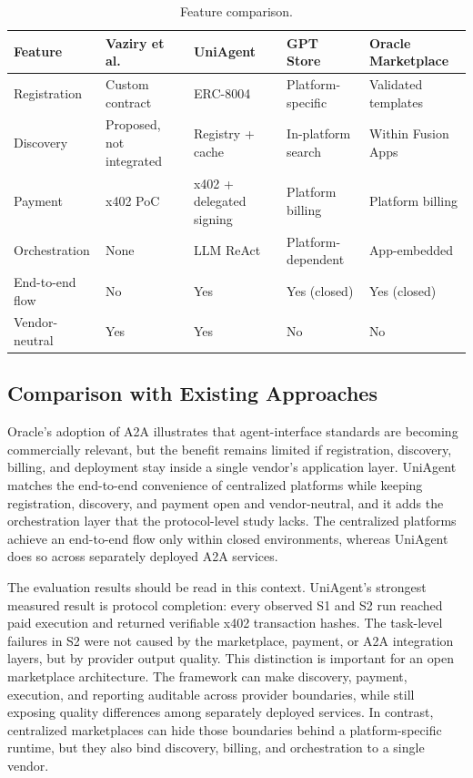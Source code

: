 \documentclass[sigconf]{acmart}
\begin{document}
\begin{table}[t]
  \centering
  \caption{Feature comparison.}
  \label{tab:comparison}
  \small
  \begin{tabular}{@{}p{}p{}p{}p{}p{}@{}}
    \toprule
    Feature & Vaziry et al. & UniAgent & GPT Store & Oracle Marketplace \\
    \midrule
    Registration & Custom contract & ERC-8004 & Platform-specific & Validated templates \\
    Discovery & Proposed, not integrated & Registry + cache & In-platform search & Within Fusion Apps \\
    Payment & x402 PoC & x402 + delegated signing & Platform billing & Platform billing \\
    Orchestration & None & LLM ReAct & Platform-dependent & App-embedded \\
    End-to-end flow & No & Yes & Yes (closed) & Yes (closed) \\
    Vendor-neutral & Yes & Yes & No & No \\
    \bottomrule
  \end{tabular}
\end{table}

\subsection{Comparison with Existing Approaches}
Oracle's adoption of A2A illustrates that agent-interface standards are becoming
commercially relevant, but the benefit remains limited if registration,
discovery, billing, and deployment stay inside a single vendor's
application layer. UniAgent matches the end-to-end
convenience of centralized platforms while keeping registration,
discovery, and payment open and vendor-neutral, and it adds the
orchestration layer that the protocol-level study lacks. The centralized
platforms achieve an end-to-end flow only within closed environments,
whereas UniAgent does so across separately deployed A2A services.

The evaluation results should be read in this context. UniAgent's
strongest measured result is protocol completion: every observed S1 and
S2 run reached paid execution and returned verifiable x402 transaction
hashes. The task-level failures in S2 were not caused by the marketplace,
payment, or A2A integration layers, but by provider output quality. This
distinction is important for an open marketplace architecture. The
framework can make discovery, payment, execution, and reporting
auditable across provider boundaries, while still exposing quality
differences among separately deployed services. In contrast, centralized
marketplaces can hide those boundaries behind a platform-specific
runtime, but they also bind discovery, billing, and orchestration to a
single vendor.
\end{document}

